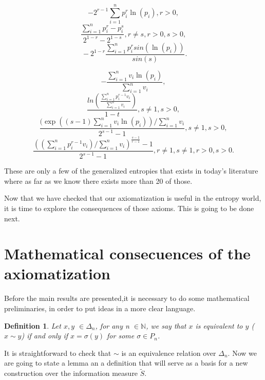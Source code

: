 \documentclass[11pt]{article}
\theoremstyle{plain}
\newtheorem{definition}[theorem]{Definition}
\begin{document}
\begin{equation}
-2^{r-1}\sum_{i=1}^{n} p_{i}^{r}\ln(p_{i}), r>0,
\end{equation}
\begin{equation}
\frac{\sum_{i=1}^{n} p_{i}^{r}-p_{i}^{s}}{2^{1-r}-2^{1-s}}, r\neq
s,r>0, s>0,
\end{equation}
\begin{equation}\
-2^{1-r}\frac{\sum_{i=1}^{n} p_{i}^{r}sin(\ln(p_{i}))}{sin(s)}.
\end{equation}

\begin{equation}
-\frac{\sum_{i=1}^{n} v_{i}\ln(p_{i})}{\sum_{i=1}^{n} v_{i}},
\end{equation}
\begin{equation}
\frac{ln(\frac{\sum_{i=1}^{n} p_{i}^{r-1}v_{i}}{\sum_{i=1}^{n}
v_{i}})}{1-t}, s\neq 1, s>0,
\end{equation}
\begin{equation}
\frac{(\exp((s-1)\sum_{i=1}^{n} v_{i}\ln(p_{i}))/\sum_{i=1}^{n}
v_{i}}{2^{s-1}-1}, s\neq 1, s>0,
\end{equation}
\begin{equation}
\frac{((\sum_{i=1}^{n} p_{i}^{r-1}v_{i})/\sum_{i=1}^{n}
v_{i})^{\frac{s-1}{r-1}}-1}{2^{s-1}-1}, r\neq 1, s\neq 1, r>0,
s>0.
\end{equation}

\medskip

These are only a few of the generalized entropies that exists in today's literature where as far as we know there exists more than 20 of those.

Now that we have checked that our axiomatization is useful in the entropy world, it is time to explore the consequences of those axioms. This is going to be done next.






\section{Mathematical consecuences of the axiomatization}

Before  the main results are presented,it is necessary to do some
mathematical preliminaries, in order to put ideas in a more clear
language.

\begin{definition}\label{thm:equivalence}
Let $x,y$ $\in\Delta_{n}$, for any n $\in\mathbb{N}$, we say that
$x$ is equivalent to $y$ ($x\sim y$) if and only if $x=\sigma(y)$ for
some $\sigma\in P_{n}$. 
\end{definition}
It is straightforward to check that $\sim $ is an equivalence relation over $\Delta_{n}$. Now we are going to state a lemma an a definition that will serve as a basis for a new construction over the information measure $\tilde{S}$.
\end{document}
